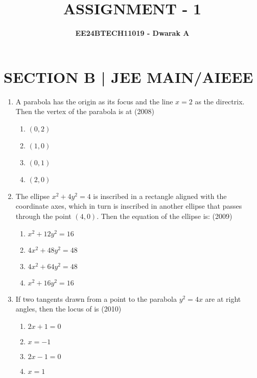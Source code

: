 \documentclass[journal,12pt,twocolumn]{IEEEtran}
\theoremstyle{remark}
\begin{document}

\vspace{3cm}

\title{\textbf{ASSIGNMENT - 1}}
\author{\textbf{EE24BTECH11019 - Dwarak A}}
\maketitle
\newpage
\bigskip

\renewcommand{\thefigure}{\theenumi}
\renewcommand{\thetable}{\theenumi}

\section*{\textbf{SECTION B | JEE MAIN/AIEEE}}
\bigskip

\begin{enumerate}
    \item A parabola has the origin as its focus and the line $x=2$ as the directrix. Then the vertex of the parabola is at
    \hfill(2008)

    \begin{enumerate}[label=(\alph*)]
    \item$(0,2)$
    \item$(1,0)$
    \item$(0,1)$
    \item$(2,0)$ \\
    \end{enumerate}
    
    \item The ellipse $x^2+4y^2=4$ is inscribed in a rectangle aligned with the coordinate axes, which in turn is inscribed in another ellipse that passes through the point $(4,0)$. Then the equation of the ellipse is:
    \hfill(2009)

    \begin{enumerate}[label=(\alph*)]
    \item$x^2+12y^2=16$
    \item$4x^2+48y^2=48$
    \item$4x^2+64y^2=48$
    \item$x^2+16y^2=16$ \\
    \end{enumerate}

    \item If two tangents drawn from a point  to the parabola $y^2=4x$ are at right angles, then the locus of  is
    \hfill(2010)
    
    \begin{enumerate}[label=(\alph*)]
    \item$2x+1=0$
    \item$x=-1$
    \item$2x-1=0$
    \item$x=1$ \\
    \end{enumerate}


\end{enumerate}
\end{document}

